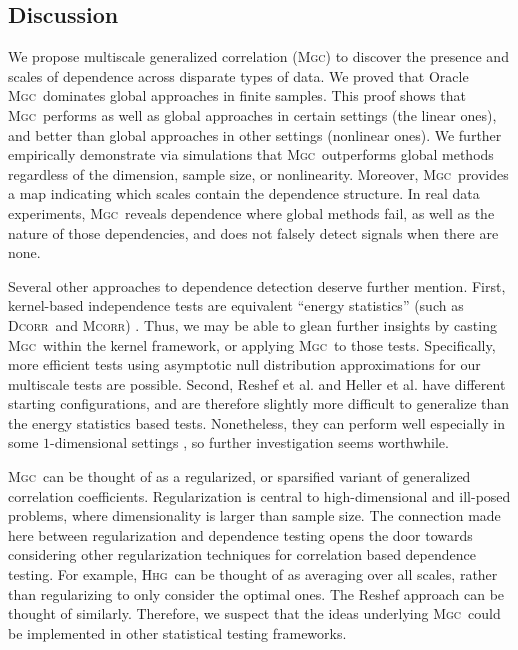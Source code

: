 \documentclass[11pt]{article}
\providecommand{\sct}[1]{{\normalfont\textsc{#1}}}
\newcommand{\Mgc}{\sct{Mgc}}
\newcommand{\Hhg}{\sct{Hhg}}
\newcommand{\Dcorr}{\sct{Dcorr}}
\newcommand{\Mcorr}{\sct{Mcorr}}
\begin{document}
\subsection*{Discussion}
\label{conclu}

We propose multiscale generalized correlation (\Mgc) to discover the presence and scales of dependence across disparate types of data.
We proved that Oracle \Mgc~dominates global approaches in finite samples.  This proof shows that \Mgc~performs as well as global approaches in certain settings (the linear ones), and better than global approaches in other settings (nonlinear ones). 
We further empirically demonstrate via simulations that \Mgc~outperforms global methods regardless of the dimension, sample size, or nonlinearity.  Moreover, \Mgc~provides a map indicating which scales contain the dependence structure. 
In real data experiments, \Mgc~reveals dependence where global methods fail, as well as the nature of those dependencies, and does not falsely detect signals when there are none.

Several other approaches to dependence detection deserve further mention. First, kernel-based independence tests  \cite{GrettonEtAl2005, GrettonGyorfi2010, GrettonEtAl2012} are equivalent ``energy statistics'' (such as \Dcorr~and \Mcorr) \cite{SejdinovicEtAl2013, RamdasEtAl2015}. Thus, we may be able to glean further insights by casting \Mgc~within the kernel framework, or applying \Mgc~to those tests. Specifically, more efficient tests using asymptotic null distribution approximations for our multiscale tests are possible.
Second, Reshef et al. \cite{Reshef2011} and Heller et al. \cite{heller2016consistent} have  different starting configurations, and are therefore slightly more difficult to generalize than the energy statistics based tests.  Nonetheless, they can perform well especially in some $1$-dimensional settings \cite{SimonTibshirani2012, reshef2015empirical}, so further investigation seems worthwhile. 


 \Mgc~can be thought of as a regularized, or sparsified variant of generalized correlation coefficients.  Regularization is central to high-dimensional and ill-posed problems, where dimensionality is larger than sample size. The connection made here between regularization and dependence testing opens the door towards considering other regularization techniques for correlation based dependence testing. For example, \Hhg~can be thought of as averaging over all scales, rather than regularizing to only consider the optimal ones. The Reshef approach can be thought of similarly.  Therefore, we suspect that the ideas underlying \Mgc~could be implemented in other statistical testing frameworks.
\end{document}
